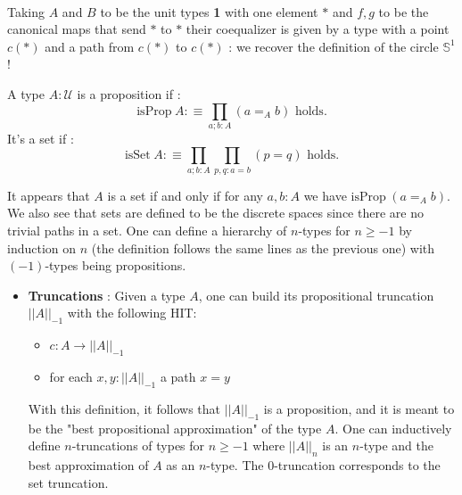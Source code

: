 \documentclass{report}
\begin{document}
\begin{itemize}
  \hfill 
  \begin{minipage}{.5\textwidth} 
    \begin{center}
      \label{fig:coequalizer}
    \end{center}
  \end{minipage}
  \\
  Taking $A$ and $B$ to be the unit types \textbf{1} with one element $*$ and $f,g$ to be the canonical maps that send $*$ to $*$ their coequalizer is given by a type with a point $c(*)$ and a path from $c(*)$ to $c(*)$ : we recover the definition of the circle $\mathbb{S}^1$ !
\end{itemize}
\begin{mydef}
  A type $A : \mathcal{U}$ is a proposition if : 
  $$\mathrm{isProp}\hspace{3pt} A :\equiv \prod_{a;b : A} (a=_A b)\text{  holds.}$$
  It's a set if :
  $$\mathrm{isSet}\hspace{3pt}A :\equiv \prod_{a;b : A} \prod_{p,q : a=b} (p= q)\text{  holds.}$$ 
\end{mydef}
It appears that $A$ is a set if and only if for any $a,b :A$ we have $\mathrm{isProp}\hspace{3pt} (a=_A b)$. We also see that sets are defined to be the discrete spaces since there are no trivial paths in a set. One can define a hierarchy of $n$-types for $n\geq -1$ by induction on $n$ (the definition follows the same lines as the previous one) with $(-1)$-types being propositions. 
\begin{itemize}
  \item \textbf{Truncations} : Given a type $A$, one can build its propositional truncation $||A||_{-1}$ with the following HIT:
    \begin{itemize}
      \item $c : A \rightarrow ||A||_{-1}$
      \item for each $x,y : ||A||_{-1}$ a path $x=y$
    \end{itemize}
    With this definition, it follows that $||A||_{-1}$ is a proposition, and it is meant to be the "best propositional approximation" of the type $A$. One can inductively define $n$-truncations of types for $n \geq -1$ where $||A||_{n}$ is an $n$-type and the best approximation of $A$ as an $n$-type. The $0$-truncation corresponds to the set truncation. 
\end{itemize} 
\end{document}
